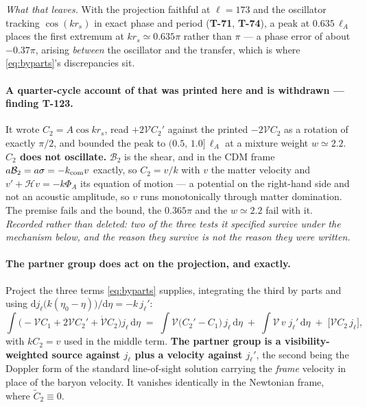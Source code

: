 \emph{What that leaves.} With the projection faithful at $\ell=173$ and the
oscillator tracking $\cos(kr_s)$ in exact phase and period (\textbf{T-71},
\textbf{T-74}), a peak at $0.635\,\ell_A$ places the first extremum at
$kr_s\simeq0.635\pi$ rather than $\pi$ --- a phase error of about $-0.37\pi$,
arising \emph{between} the oscillator and the transfer, which is where
\eqref{eq:byparts}'s discrepancies sit.

\paragraph{A quarter-cycle account of that was printed here and is withdrawn
--- finding T-123.} It wrote $C_2=A\cos kr_s$, read $+2\mathcal VC_2'$ against
the printed $-2\mathcal VC_2$ as a rotation of exactly $\pi/2$, and bounded the
peak to $(0.5,\,1.0]\,\ell_A$ at a mixture weight $w\simeq2.2$. \textbf{$C_2$
does not oscillate.} $\mathcal B_2$ is the shear, and in the CDM frame
$a\mathcal B_2=a\sigma=-k_{\rm com}v$ exactly, so $C_2=v/k$ with $v$ the matter
velocity and $v'+\mathcal Hv=-k\Phi_A$ its equation of motion --- a potential
on the right-hand side and not an acoustic amplitude, so $v$ runs monotonically
through matter domination. The premise fails and the bound, the $0.365\pi$ and
the $w\simeq2.2$ fail with it. \emph{Recorded rather than deleted: two of the
three tests it specified survive under the mechanism below, and the reason they
survive is not the reason they were written.}

\paragraph{The partner group does act on the projection, and exactly.} Project
the three terms \eqref{eq:byparts} supplies, integrating the third by parts and
using $\mathrm dj_\ell\big(k(\eta_0-\eta)\big)/\mathrm d\eta=-k\,j_\ell'$:
\begin{equation}
  \int\!\big(\!-\mathcal VC_1+2\mathcal VC_2'+\dot{\mathcal V}C_2\big)j_\ell\,\mathrm d\eta
  \;=\;
  \int\!\mathcal V\big(C_2'-C_1\big)\,j_\ell\,\mathrm d\eta
  \;+\;\int\!\mathcal V\,v\;j_\ell'\,\mathrm d\eta
  \;+\;\big[\mathcal VC_2\,j_\ell\big],
  \label{eq:partner-projection}
\end{equation}
with $kC_2=v$ used in the middle term. \textbf{The partner group is a
visibility-weighted source against $j_\ell$ plus a velocity against
$j_\ell'$}, the second being the Doppler form of the standard line-of-sight
solution carrying the \emph{frame} velocity in place of the baryon velocity.
It vanishes identically in the Newtonian frame, where $\tilde C_2\equiv0$.

